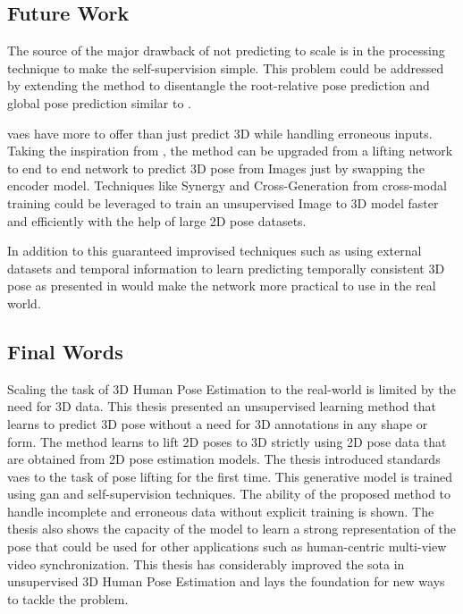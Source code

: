 \subsection{Future Work}

The source of the major drawback of not predicting to scale is in the processing technique to make the self-supervision simple. This problem could be addressed by extending the method to disentangle the root-relative pose prediction and global pose prediction similar to \cite{CameraDistanceAware}. 

\acp{vae} have more to offer than just predict 3D while handling erroneous inputs. Taking the inspiration from \cite{crossmodal}, the method can be upgraded from a lifting network to end to end network to predict 3D pose from Images just by swapping the encoder model. Techniques like Synergy and Cross-Generation from cross-modal training \cite{MMVAE} could be leveraged to train an unsupervised Image to 3D model faster and efficiently with the help of large 2D pose datasets.

In addition to this guaranteed improvised techniques such as using external datasets and temporal information to learn predicting temporally consistent 3D pose as presented in \cite{amazon1} would make the network more practical to use in the real world.

\subsection{Final Words}

Scaling the task of 3D Human Pose Estimation to the real-world is limited by the need for 3D data. This thesis presented an unsupervised learning method that learns to predict 3D pose without a need for 3D annotations in any shape or form. The method learns to lift 2D poses to 3D strictly using 2D pose data that are obtained from 2D pose estimation models. The thesis introduced standards \acp{vae} to the task of pose lifting for the first time. This generative model is trained using \ac{gan} and self-supervision techniques. The ability of the proposed method to handle incomplete and erroneous data without explicit training is shown. The thesis also shows the capacity of the model to learn a strong representation of the pose that could be used for other applications such as human-centric multi-view video synchronization. This thesis has considerably improved the \ac{sota} in unsupervised 3D Human Pose Estimation and lays the foundation for new ways to tackle the problem.




